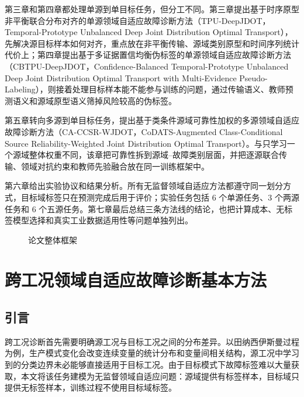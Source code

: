 \documentclass{seuthesis-2022}
\begin{document}
第三章和第四章都处理单源到单目标任务，但分工不同。第三章提出基于时序原型非平衡联合分布对齐的单源领域自适应故障诊断方法（TPU-DeepJDOT，Temporal-Prototype Unbalanced Deep Joint Distribution Optimal Transport），先解决源目标样本如何对齐，重点放在非平衡传输、源域类别原型和时间序列统计代价上；第四章提出基于多证据置信均衡伪标签的单源领域自适应故障诊断方法（CBTPU-DeepJDOT，Confidence-Balanced Temporal-Prototype Unbalanced Deep Joint Distribution Optimal Transport with Multi-Evidence Pseudo-Labeling），则接着处理目标样本能不能参与训练的问题，通过传输语义、教师预测语义和源域原型语义筛掉风险较高的伪标签。

第五章转向多源到单目标任务，提出基于类条件源域可靠性加权的多源领域自适应故障诊断方法（CA-CCSR-WJDOT，CoDATS-Augmented Class-Conditional Source Reliability-Weighted Joint Distribution Optimal Transport）。与只学习一个源域整体权重不同，该章把可靠性拆到源域--故障类别层面，并把逐源联合传输、领域对抗约束和教师先验融合放在同一训练框架中。

第六章给出实验协议和结果分析。所有无监督领域自适应方法都遵守同一划分方式，目标域标签只在预测完成后用于评价；实验任务包括 6 个单源任务、3 个两源任务和 6 个五源任务。第七章最后总结三条方法线的结论，也把计算成本、无标签模型选择和真实工业数据适用性等问题单独列出。

\begin{figure}[!htbp]
    \centering
    \resizebox{\textwidth}{!}{\ignorespaces\unskip}%
    \caption{论文整体框架}
    \label{fig:ch1_thesis_structure}
\end{figure}

\chapter{跨工况领域自适应故障诊断基本方法}

\section{引言}

跨工况诊断首先需要明确源工况与目标工况之间的分布差异。以田纳西伊斯曼过程为例，生产模式变化会改变连续变量的统计分布和变量间相关结构，源工况中学习到的分类边界未必能够直接适用于目标工况。由于目标模式下故障标签难以大量获取，本文将该任务建模为无监督领域自适应问题：源域提供有标签样本，目标域只提供无标签样本，训练过程不使用目标域标签。
\end{document}
